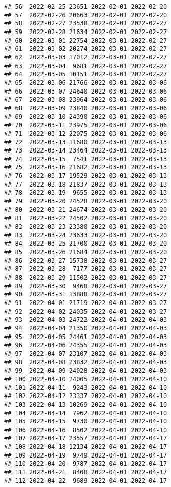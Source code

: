 \documentclass[
]{article}
\begin{document}
\begin{verbatim}
## 56  2022-02-25 23651 2022-02-01 2022-02-20
## 57  2022-02-26 20663 2022-02-01 2022-02-20
## 58  2022-02-27 23538 2022-02-01 2022-02-27
## 59  2022-02-28 21634 2022-02-01 2022-02-27
## 60  2022-03-01 22754 2022-03-01 2022-02-27
## 61  2022-03-02 20274 2022-03-01 2022-02-27
## 62  2022-03-03 17012 2022-03-01 2022-02-27
## 63  2022-03-04  9681 2022-03-01 2022-02-27
## 64  2022-03-05 10151 2022-03-01 2022-02-27
## 65  2022-03-06 21766 2022-03-01 2022-03-06
## 66  2022-03-07 24640 2022-03-01 2022-03-06
## 67  2022-03-08 23964 2022-03-01 2022-03-06
## 68  2022-03-09 23840 2022-03-01 2022-03-06
## 69  2022-03-10 24390 2022-03-01 2022-03-06
## 70  2022-03-11 23975 2022-03-01 2022-03-06
## 71  2022-03-12 22075 2022-03-01 2022-03-06
## 72  2022-03-13 11680 2022-03-01 2022-03-13
## 73  2022-03-14 23464 2022-03-01 2022-03-13
## 74  2022-03-15  7541 2022-03-01 2022-03-13
## 75  2022-03-16 21682 2022-03-01 2022-03-13
## 76  2022-03-17 19529 2022-03-01 2022-03-13
## 77  2022-03-18 21837 2022-03-01 2022-03-13
## 78  2022-03-19  9655 2022-03-01 2022-03-13
## 79  2022-03-20 24528 2022-03-01 2022-03-20
## 80  2022-03-21 24674 2022-03-01 2022-03-20
## 81  2022-03-22 24502 2022-03-01 2022-03-20
## 82  2022-03-23 23380 2022-03-01 2022-03-20
## 83  2022-03-24 23633 2022-03-01 2022-03-20
## 84  2022-03-25 21700 2022-03-01 2022-03-20
## 85  2022-03-26 21684 2022-03-01 2022-03-20
## 86  2022-03-27 15738 2022-03-01 2022-03-27
## 87  2022-03-28  7177 2022-03-01 2022-03-27
## 88  2022-03-29 11502 2022-03-01 2022-03-27
## 89  2022-03-30  9468 2022-03-01 2022-03-27
## 90  2022-03-31 13888 2022-03-01 2022-03-27
## 91  2022-04-01 21719 2022-04-01 2022-03-27
## 92  2022-04-02 24035 2022-04-01 2022-03-27
## 93  2022-04-03 24722 2022-04-01 2022-04-03
## 94  2022-04-04 21350 2022-04-01 2022-04-03
## 95  2022-04-05 24461 2022-04-01 2022-04-03
## 96  2022-04-06 24355 2022-04-01 2022-04-03
## 97  2022-04-07 23107 2022-04-01 2022-04-03
## 98  2022-04-08 23832 2022-04-01 2022-04-03
## 99  2022-04-09 24028 2022-04-01 2022-04-03
## 100 2022-04-10 24005 2022-04-01 2022-04-10
## 101 2022-04-11  9243 2022-04-01 2022-04-10
## 102 2022-04-12 23337 2022-04-01 2022-04-10
## 103 2022-04-13 10269 2022-04-01 2022-04-10
## 104 2022-04-14  7962 2022-04-01 2022-04-10
## 105 2022-04-15  9730 2022-04-01 2022-04-10
## 106 2022-04-16  8502 2022-04-01 2022-04-10
## 107 2022-04-17 23557 2022-04-01 2022-04-17
## 108 2022-04-18 12134 2022-04-01 2022-04-17
## 109 2022-04-19  9749 2022-04-01 2022-04-17
## 110 2022-04-20  9787 2022-04-01 2022-04-17
## 111 2022-04-21  8408 2022-04-01 2022-04-17
## 112 2022-04-22  9689 2022-04-01 2022-04-17

\end{verbatim}
\end{document}
